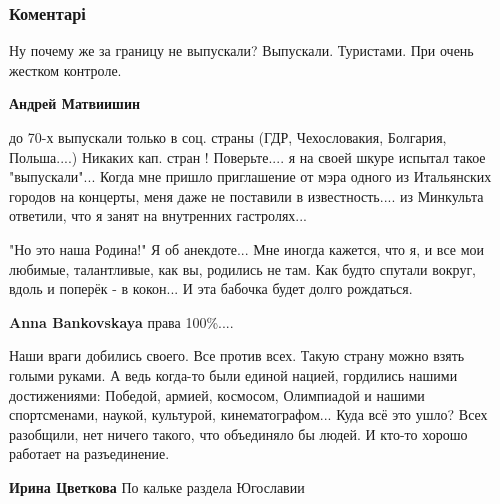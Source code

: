  
 
 
 
 
\subsubsection{Коментарі}
\label{sec:03_12_2021.fb.bystrjakov_vladimir.1.strana_inficirovana.cmt}

\begin{itemize} %
Ну почему же за границу не выпускали? Выпускали. Туристами. При очень жестком контроле.

\begin{itemize} %
\textbf{Андрей Матвиишин} 

до 70-х выпускали только в соц. страны (ГДР, Чехословакия, Болгария, Польша....)
Никаких кап. стран ! Поверьте.... я на своей шкуре испытал такое "выпускали"...
Когда мне пришло приглашение от мэра одного из Итальянских городов на концерты,
меня даже не поставили в известность.... из Минкульта ответили, что я занят на
внутренних гастролях...

\end{itemize} %


"Но это наша Родина!" Я об анекдоте... Мне иногда кажется, что я, и все мои
любимые, талантливые, как вы, родились не там. Как будто спутали вокруг, вдоль
и поперёк - в кокон... И эта бабочка будет долго рождаться.

\textbf{Anna Bankovskaya} права 100\%....


Наши враги добились своего. Все против всех. Такую страну можно взять голыми
руками. А ведь когда-то были единой нацией, гордились нашими
достижениями: Победой, армией, космосом, Олимпиадой и нашими спортсменами,
наукой, культурой, кинематографом... Куда всё это ушло? Всех разобщили, нет
ничего такого, что объединяло бы людей. И кто-то хорошо работает на
разъединение.

\begin{itemize} %
\textbf{Ирина Цветкова} По кальке раздела Югославии


\end{itemize}
\end{itemize}
